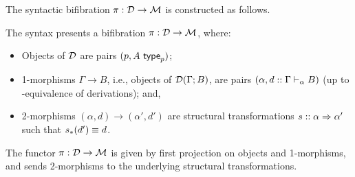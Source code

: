 The syntactic bifibration $\pi : \mathcal{D} \to \mathcal{M}$ is constructed as follows.

\begin{theorem}
The syntax presents a bifibration $\pi : \mathcal{D} \to \mathcal{M}$, where:
\begin{itemize}
\item Objects of $\mathcal{D}$ are pairs $(p, A \,\, \mathsf{type}_{p})$;
\item 1-morphisms $\Gamma \to B$, i.e., objects of $\mathcal{D}(\Gamma; B)$, are pairs $(\alpha, d :: \Gamma \vdash_{\alpha} B)$ (up to \deq-equivalence of derivations); and,
\item 2-morphisms $(\alpha, d) \to (\alpha', d')$ are structural transformations $s :: \alpha \Rightarrow \alpha'$ such that $s_*(d') \equiv d$.
\end{itemize}
The functor $\pi : \mathcal{D} \to \mathcal{M}$ is given by first projection on objects and 1-morphisms, and sends 2-morphisms to the underlying structural transformations.
\end{theorem}

